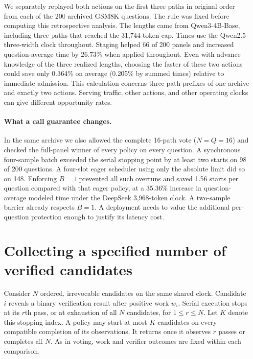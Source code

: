 We separately replayed both actions on the first three paths in original order from each of the 200 archived GSM8K questions. The rule was fixed before computing this retrospective analysis. The lengths came from Qwen3-4B-Base, including three paths that reached the 31,744-token cap. Times use the Qwen2.5 three-width clock throughout. Staging helped 66 of 200 panels and increased question-average time by 26.73\% when applied throughout. Even with advance knowledge of the three realized lengths, choosing the faster of these two actions could save only 0.364\% on average (0.205\% by summed times) relative to immediate admission. This calculation concerns three-path prefixes of one archive and exactly two actions. Serving traffic, other actions, and other operating clocks can give different opportunity rates.

\paragraph{What a call guarantee changes.}
In the same archive we also allowed the complete 16-path vote ($N=Q=16$) and checked the full-panel winner of every policy on every question. A synchronous four-sample batch exceeded the serial stopping point by at least two starts on 98 of 200 questions. A four-slot eager scheduler using only the absolute limit did so on 148. Enforcing $B=1$ prevented all such overruns and saved 1.56 starts per question compared with that eager policy, at a 35.36\% increase in question-average modeled time under the DeepSeek 3,968-token clock. A two-sample barrier already respects $B=1$. A deployment needs to value the additional per-question protection enough to justify its latency cost.

\section{Collecting a specified number of verified candidates}\label{app:rpass}
Consider $N$ ordered, irrevocable candidates on the same shared clock. Candidate $i$ reveals a binary verification result after positive work $w_i$. Serial execution stops at its $r$th pass, or at exhaustion of all $N$ candidates, for $1\le r\le N$. Let $K$ denote this stopping index. A policy may start at most $K$ candidates on every compatible completion of its observations. It returns once it observes $r$ passes or completes all $N$. As in voting, work and verifier outcomes are fixed within each comparison.


